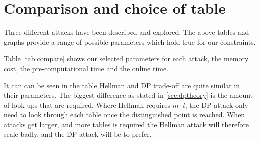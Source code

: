 \newpage
\section{Comparison and choice of table}
Three different attacks have been described and explored. The above
tables and graphs provide a range of possible parameters which hold true for our
constraints.

Table \ref{tab:compare} shows our selected parameters for each attack,
the memory cost, the pre-computational time and the online time. 

It can can be seen in the table Hellman and DP trade-off are quite similar in
their parameters. The biggest difference as stated in \ref{sec:dptheory}
is the amount of look ups that are required. Where Hellman
requires $m \cdot l$, the DP attack only need to look through each
table once the distinguished point is reached. When attacks get
larger, and more tables is required the Hellman attack will therefore
scale badly, and the DP attack will be to prefer.

